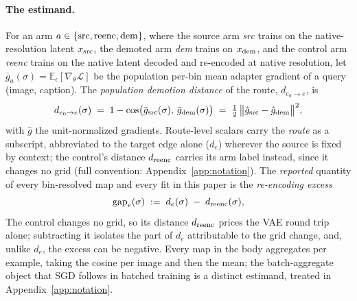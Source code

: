 \paragraph{The estimand.}
For an arm $a \in \{\mathrm{src}, \mathrm{reenc}, \mathrm{dem}\}$, where the source arm
\emph{src} trains on the native-resolution latent $x_{\mathrm{src}}$, the demoted
arm \emph{dem} trains on $x_{\mathrm{dem}}$, and the control arm \emph{reenc} trains
on the native latent decoded and re-encoded at native resolution, let
$\bar g_a(\sigma) = \mathbb{E}_\epsilon[\nabla_\theta \mathcal{L}]$ be
the population per-bin mean adapter gradient of a query (image,
caption). The \emph{population demotion distance} of the route,
$d_{e_0 \to e}$, is
\begin{equation}
d_{e_0 \to e}(\sigma) \;=\; 1 - \cos\!\big(\bar g_{\mathrm{src}}(\sigma),\,
\bar g_{\mathrm{dem}}(\sigma)\big)
\;=\; \tfrac{1}{2}\,\big\|\hat g_{\mathrm{src}} - \hat g_{\mathrm{dem}}\big\|^2,
\label{eq:gapdef}
\end{equation}
with $\hat g$ the unit-normalized gradients. Route-level scalars carry
the \emph{route} as a subscript, abbreviated to the target edge alone
($d_e$) wherever the source is fixed by context; the
control's distance $d_{\mathrm{reenc}}$ carries its arm label instead, since it
changes no grid (full convention: Appendix~\ref{app:notation}). The
\emph{reported} quantity of every bin-resolved map and every fit in this
paper is the \emph{re-encoding excess}
\begin{equation}
\mathrm{gap}_e(\sigma) \;:=\; d_e(\sigma) \;-\; d_{\mathrm{reenc}}(\sigma),
\label{eq:excess}
\end{equation}
The control changes no grid, so its distance $d_{\mathrm{reenc}}$ prices the
VAE round trip alone; subtracting it isolates the part of $d_e$
attributable to the grid change, and, unlike $d_e$, the excess can
be negative. Every
map in the body aggregates per example, taking the cosine per image
and then the mean; the batch-aggregate object that SGD follows in
batched training is a distinct estimand, treated in
Appendix~\ref{app:notation}.


